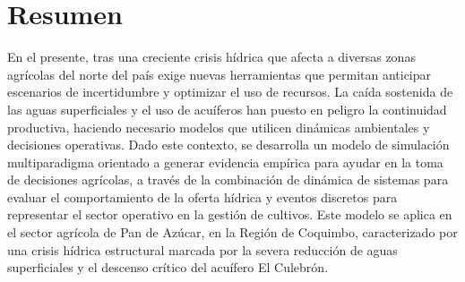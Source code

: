 \documentclass[12pt]{report}
\begin{document}
\listoffigures

\listoftables

\newpage
{}
\section*{Resumen}

En el presente, tras una creciente crisis hídrica que afecta a diversas zonas agrícolas del norte del país exige nuevas herramientas que permitan anticipar escenarios de incertidumbre y optimizar el uso de recursos. La caída sostenida de las aguas superficiales y el uso de acuíferos han puesto en peligro la continuidad productiva, haciendo necesario modelos que utilicen dinámicas ambientales y decisiones operativas. Dado este contexto, se desarrolla un modelo de simulación multiparadigma orientado a generar evidencia empírica para ayudar en la toma de decisiones agrícolas, a través de la combinación de dinámica de sistemas para evaluar el comportamiento de la oferta hídrica y eventos discretos para representar el sector operativo en la gestión de cultivos. Este modelo se aplica en el sector agrícola de Pan de Azúcar, en la Región de Coquimbo, caracterizado por una crisis hídrica estructural marcada por la severa reducción de aguas superficiales y el descenso crítico del acuífero El Culebrón.


\end{document}
